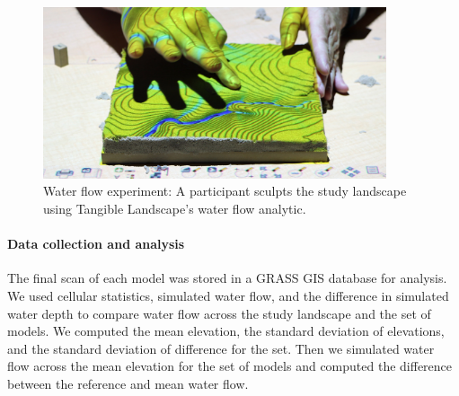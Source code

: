 \documentclass[prodmode,acmtochi]{acmsmall} %
\begin{document}
\begin{figure}
\begin{center}
	\includegraphics[width=0.9\textwidth]{images/experiments/tl_water.jpg}
	\caption{Water flow experiment: 
	A participant sculpts the study landscape using Tangible Landscape's water flow
	analytic.}
	\label{fig:flow_sequence}
\end{center}
\end{figure}

\paragraph{Data collection and analysis}
The final scan of each model was stored in a GRASS GIS database for analysis. 
We used cellular statistics, simulated water flow, and the difference in simulated water depth 
to compare water flow across the study landscape and the set of models.
We computed the mean elevation,
the standard deviation of elevations, 
and the standard deviation of difference for the set.
Then we simulated water flow across the mean elevation for the set of models
and computed the difference between the reference and mean water flow. 
\end{document}
